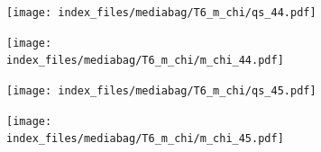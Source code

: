 \documentclass[
  11pt,
  letterpaper,
]{scrreprt}
\begin{document}
\begin{figure}

\begin{minipage}{0.50\linewidth}

\begin{figure}[H]

{\centering \texttt{[image: index\_files/mediabag/T6\_m\_chi/qs\_44.pdf]}

}


\end{figure}%

\end{minipage}%
%
\begin{minipage}{0.50\linewidth}

\begin{figure}[H]

{\centering \texttt{[image: index\_files/mediabag/T6\_m\_chi/m\_chi\_44.pdf]}

}


\end{figure}%

\end{minipage}%

\end{figure}%

\begin{figure}

\begin{minipage}{0.50\linewidth}

\begin{figure}[H]

{\centering \texttt{[image: index\_files/mediabag/T6\_m\_chi/qs\_45.pdf]}

}


\end{figure}%

\end{minipage}%
%
\begin{minipage}{0.50\linewidth}

\begin{figure}[H]

{\centering \texttt{[image: index\_files/mediabag/T6\_m\_chi/m\_chi\_45.pdf]}

}


\end{figure}%

\end{minipage}%

\end{figure}%
\end{document}
